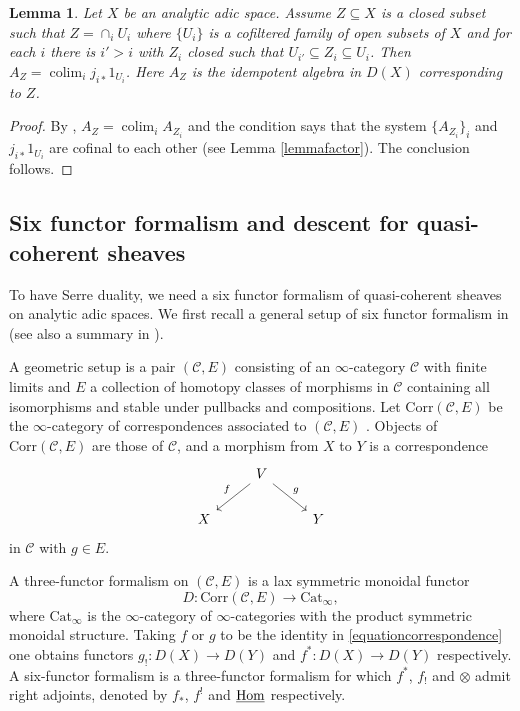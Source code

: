 \documentclass[a4paper,10pt]{amsart}
\theoremstyle{remark}
\theoremstyle{definition}
\theoremstyle{plain}
\newtheorem{lemma}[theorem]{Lemma}
\numberwithin{equation}{section}
\newcommand{\calC}{{\mathcal C}}
\newcommand{\Hom}{{\rm Hom}}
\DeclareMathOperator{\colim}{colim}
\begin{document}
 
 \begin{lemma}\label{lemmacompute}
	Let $X$ be an analytic adic space. Assume $Z\subseteq X$ is a closed subset such that $Z=\cap_i U_i$ where $\{U_i\}$ is a cofiltered family of open subsets of $X$ and for each $i$ there is $i'>i$ with $Z_i$ closed such that $U_{i'}\subseteq Z_i\subseteq U_i$. Then $A_Z=\colim_i j_{i*}1_{U_i}$. Here $A_Z$ is the idempotent algebra in $D(X)$ corresponding to $Z$.
\end{lemma}

\begin{proof}
	 By \cite[Prop.~5.3(4)]{scholze2022complex}, $A_Z=\colim_i A_{Z_i}$ and the condition says that the system $\{A_{Z_i}\}_i$ and $j_{i*}1_{U_i}$ are cofinal to each other (see Lemma \ref{lemmafactor}). The conclusion follows.
\end{proof}
\subsection{Six functor formalism and descent for quasi-coherent sheaves} 
To have Serre duality, we need a six functor formalism of quasi-coherent sheaves on analytic adic spaces. We first recall a general setup of six functor formalism in \cite[\S~A.5]{mann2022p} (see also a summary in \cite[\S~3.1]{camargo2024analytic}).

A geometric setup \cite[Def.~A.5.1]{mann2022p} is a pair $(\calC,E)$ consisting of an $\infty$-category $\calC$ with finite limits and $E$ a collection of homotopy classes of morphisms in $\calC$ containing all isomorphisms and stable under pullbacks and compositions. Let $\mathrm{Corr}(\calC,E)$ be the $\infty$-category of correspondences associated to $(\calC,E)$ \cite[Def.~A.5.2]{mann2022p}. Objects of $\mathrm{Corr}(\calC,E)$ are those of $\calC$, and a morphism from $X$ to $Y$ is a correspondence
\begin{equation}\label{equationcorrespondence}
	\begin{tikzcd}
		& V\ar[ld,"f"']\ar[rd,"g"]\\
		X && Y
	\end{tikzcd}		
\end{equation}
in $\calC$ with $g\in E$. 

A three-functor formalism \cite[Def.~A.5.6]{mann2022p} on $(\calC,E)$ is a lax symmetric monoidal functor 
\[D:\mathrm{Corr}(\calC,E)\to \mathrm{Cat}_\infty,\]
where $\mathrm{Cat}_\infty$ is the $\infty$-category of $\infty$-categories with the product symmetric monoidal structure. Taking $f$ or $g$ to be the identity in \eqref{equationcorrespondence} one obtains functors $ g_!:D(X)\rightarrow D(Y)$ and $f^*:D(X)\rightarrow D(Y)$ respectively. A six-functor formalism \cite[Def.~A.5.7]{mann2022p} is a three-functor formalism for which $f^*$, $f_!$ and $\otimes$ admit right adjoints, denoted by $f_*$, $f^!$ and $\underline{\Hom}$ respectively.
\end{document}
